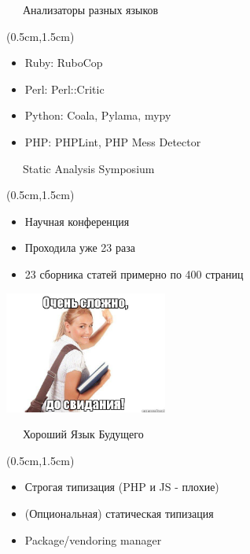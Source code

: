 \documentclass[xetex,18pt,aspectratio=43]{beamer}
\begin{document}
\begin{Large}
\begin{frame}{\ \ \ Анализаторы разных языков}
\begin{textblock*}{\framewidth-0.8cm}(0.5cm,1.5cm)
\begin{itemize}
  \item Ruby: RuboCop
  \item Perl: Perl::Critic
  \item Python: Coala, Pylama, mypy
  \item PHP: PHPLint, PHP Mess Detector
\end{itemize}
\end{textblock*}
\end{frame}

\begin{frame}{\ \ \ Static Analysis Symposium}
\begin{textblock*}{\framewidth}(0.5cm,1.5cm)
\begin{itemize}
  \item Научная конференция
  \item Проходила уже 23 раза
  \item 23 сборника статей примерно по 400 страниц
\end{itemize}
\begin{minipage}{\textwidth}
  \centering
  \includegraphics[height=4.0cm]{img/slozhna}
\end{minipage}
\end{textblock*}
\end{frame}

\begin{frame}{\ \ \ Хороший Язык Будущего}
\begin{textblock*}{\framewidth-0.8cm}(0.5cm,1.5cm)
\begin{itemize}
  \item Строгая типизация (PHP и JS - плохие)
  \item (Опциональная) статическая типизация
  \item Package/vendoring manager
\end{itemize}
\end{textblock*}
\end{frame}


\end{Large}
\end{document}
